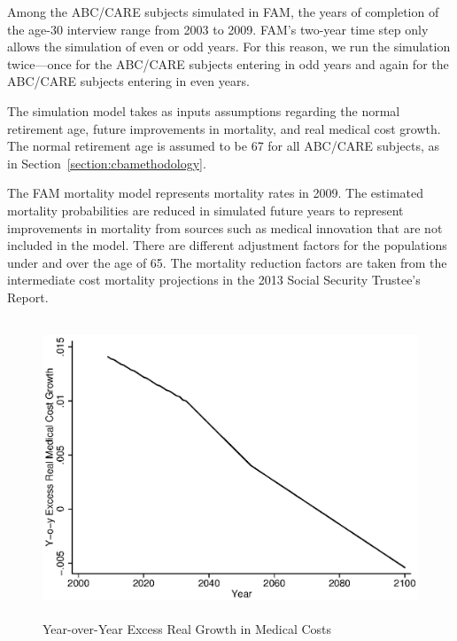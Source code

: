 \noindent Among the ABC/CARE subjects simulated in FAM, the years of completion of the age-30 interview range from 2003 to 2009. FAM's two-year time step only allows the simulation of even or odd years. For this reason, we run the simulation twice---once for the ABC/CARE subjects entering in odd years and again for the ABC/CARE subjects entering in even years.

\noindent The simulation model takes as inputs assumptions regarding the normal retirement age, future improvements in mortality, and real medical cost growth. The normal retirement age is assumed to be 67 for all ABC/CARE subjects, as in Section~\ref{section:cbamethodology}.

\noindent The FAM mortality model represents mortality rates in 2009. The estimated mortality probabilities are reduced in simulated future years to represent improvements in mortality from sources such as medical innovation that are not included in the model. There are different adjustment factors for the populations under and over the age of 65. The mortality reduction factors are taken from the intermediate cost mortality projections in the 2013 Social Security Trustee's Report.

\begin{figure}
\caption{Year-over-Year Excess Real Growth in Medical Costs} \label{figure:medgrowth_yearly}
 \centering
	 \includegraphics[height=3.5in]{AppOutput/Health/medgrowth_yearly}
\end{figure}


